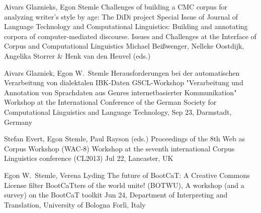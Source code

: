 \documentclass[11pt,a4paper]{moderncv}
\begin{document}
        {Aivars Glaznieks, Egon Stemle}
        {\small Challenges of building a CMC corpus for analyzing writer's
        style by age: The DiDi project} 
        {\small Special Issue of Journal of Language Technology and
        Computational Linguistics: Building and annotating corpora of
        computer-mediated discourse. Issues and Challenges at the Interface of
        Corpus and Computational Linguistics}
        {\small Michael Beißwenger, Nelleke Oostdijk, Angelika Storrer \& Henk van den Heuvel (eds.)}
        {}

        {Aivars Glazniek, Egon W.~Stemle}
        {\small Herausforderungen bei der automatischen Verarbeitung von dialektalen IBK-Daten}
        {\small GSCL-Workshop "Verarbeitung und Annotation von Sprachdaten aus
        Genres internetbasierter Kommunikation"}
        {\small Workshop at the International Conference of the German Society
        for Computational Linguistics and Language Technology, Sep 23,
        Darmstadt, Germany}
        {}

        {Stefan Evert, Egon Stemle, Paul Rayson (eds.)}
        {\small Proceedings of the 8th Web as Corpus Workshop (WAC-8)}
        {\small Workshop at the seventh international Corpus Linguistics conference (CL2013)}
        {\small Jul 22, Lancaster, UK}
        {}


        {Egon W.~Stemle, Verena Lyding}
        {\small The future of BootCaT: A Creative Commons License filter}
        {\small BootCaTters of the world unite! (BOTWU), A workshop (and a
        survey) on the BootCaT toolkit}
        {\small Jun 24, Department of Interpreting and Translation, University
        of Bologna Forl\`{i}, Italy}
        {}

\end{document}
